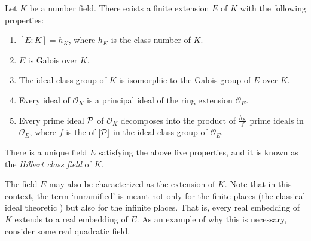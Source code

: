 \documentclass[12pt]{article}
\newcommand{\rai}[1]{\mathcal{O}_{#1}}
\begin{document}
Let $K$ be a number field.  There exists a finite extension $E$ of $K$ with the following properties:
  \begin{enumerate}
  \item $[E:K]=h_K$, where $h_K$ is the class number of $K$.
  \item $E$ is Galois over $K$.
  \item The ideal class group of $K$ is isomorphic to the Galois group of
        $E$ over $K$.
  \item Every ideal of $\rai{K}$ is a principal ideal of the ring extension $\rai{E}$.
  \item Every prime ideal ${\cal P}$ of $\rai{K}$ decomposes into the product of
        $\frac{h_K}{f}$ prime ideals in $\rai{E}$, where $f$ is the 
        of $[{\cal P}]$ in the ideal class group of $\rai{E}$.
  \end{enumerate}
There is a unique field $E$ satisfying the above five properties, and it is known as the {\em Hilbert class field} of $K$.

The field $E$ may also be characterized as the  extension of $K$.  Note that in this context, the term `unramified' is meant not only for the finite places (the classical ideal theoretic ) but also for the infinite places.  That is, every real embedding of $K$ extends to a real embedding of $E$.  As an example of why this is necessary, consider some real quadratic field.
\end{document}
